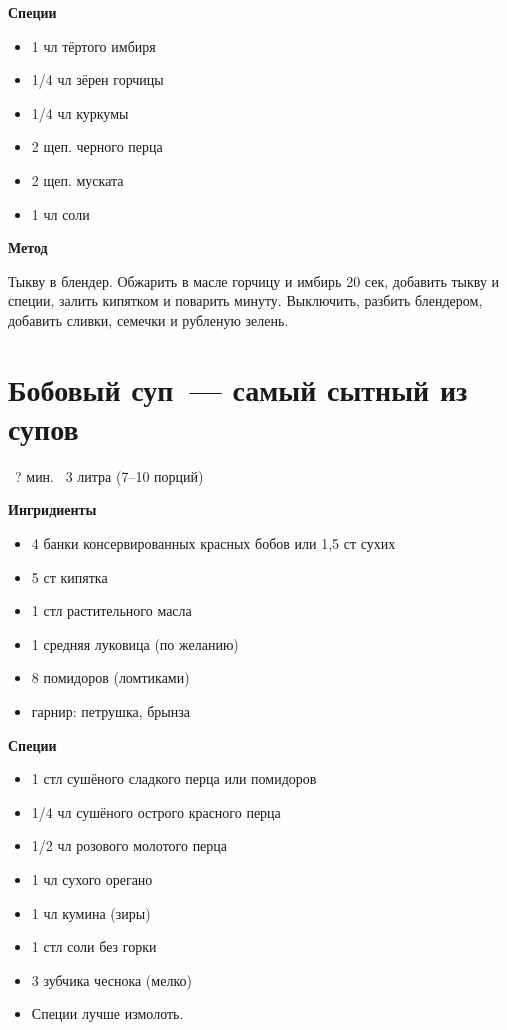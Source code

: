 \textbf{Специи}
\begin{itemize}
\item 1 чл тёртого имбиря
\item 1/4 чл зёрен горчицы
\item 1/4 чл куркумы
\item 2 щеп. черного перца
\item 2 щеп. муската
\item 1 чл соли
\end{itemize}


\textbf{\large Метод}

Тыкву в блендер. Обжарить в масле горчицу и имбирь 20 сек, добавить тыкву и специи, залить кипятком и поварить минуту. Выключить, разбить блендером, добавить сливки, семечки и рубленую зелень. 









\newpage
\section*{\Large Бобовый суп~--- самый сытный из супов}
\label{sec:soup2}

\faClockO\ ? мин. \hfill \faSpoon\ 3 литра (7–10 порций)


\textbf{\large Ингридиенты}
\begin{itemize}
\item 4 банки консервированных красных бобов или 1,5 ст сухих
\item 5 ст кипятка
\item 1 стл растительного масла
\item 1 средняя луковица (по желанию)
\item 8 помидоров (ломтиками)
\item гарнир: петрушка, брынза
\end{itemize}

\textbf{Специи}
\begin{itemize}
\item 1 стл сушёного сладкого перца или помидоров
\item 1/4 чл сушёного острого красного перца
\item 1/2 чл розового молотого перца
\item 1 чл сухого орегано
\item 1 чл кумина (зиры)
\item 1 стл соли без горки
\item 3 зубчика чеснока (мелко)
\end{itemize}
\begin{formal}
\begin{itemize}
\item Специи лучше измолоть.
\end{itemize}
\end{formal}

